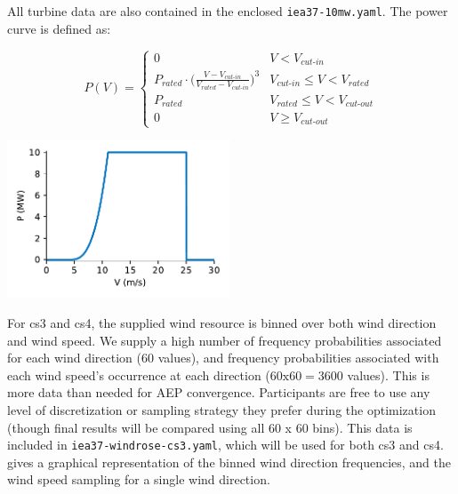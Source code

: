 \documentclass[10pt]{article}
\begin{document}
        \noindent All turbine data are also contained in the enclosed \texttt{iea37-10mw.yaml}. The power curve is defined as:   

        \begin{minipage}{0.53\textwidth}
            \begin{equation*}
                P(V) = 
                \begin{cases} 
                    0 & V < V_{\textit{cut-in}} \\
                    P_{\textit{rated}}\cdot\bigg(\frac{V-V_{\textit{cut-in}}}{V_{\textit{rated}}-V_{\textit{cut-in}}}\bigg)^3 & V_{\textit{cut-in}}\leq V < V_{\textit{rated}} \\
                    P_{\textit{rated}} & V_{\textit{rated}} \leq V < V_{\textit{cut-out}} \\
                    0 & V \geq V_{\textit{cut-out}}
                \end{cases}
            \label{eq:power}
            \end{equation*}
        \end{minipage}\quad
        \begin{minipage}{0.53\textwidth}
            \includegraphics[width=2.6in]{power_curve.pdf}
        \end{minipage}

        For cs3 and cs4, the supplied wind resource is binned over both wind direction and wind speed.
        We supply a high number of frequency probabilities associated for each wind direction (60 values), and frequency probabilities associated with each wind speed's occurrence at each direction ($60\text{x}60=3600$ values).
        This is more data than needed for AEP convergence.  Participants are free to use any level of discretization or sampling strategy they prefer during the optimization (though final results will be compared using all 60 x 60 bins).  
        This data is included in \texttt{iea37-windrose-cs3.yaml}, which will be used for both cs3 and cs4.
         gives a graphical representation of the binned wind direction frequencies, and the wind speed sampling for a single wind direction.
       
\end{document}
